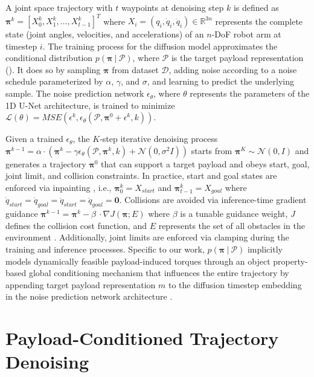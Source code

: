 A joint space trajectory with $t$ waypoints at denoising step $k$ is defined as
$\bm{\pi}^k = [ X_0^k, X_1^k, \dots, X_{t-1}^k ]^T$
where $X_i = (q_i, \dot{q}_i, \ddot{q}_i) \in \mathbb{R}^{3n}$ represents the complete state (joint angles, velocities, and accelerations) of an $n$-DoF robot arm at timestep $i$.
The training process for the diffusion model approximates the conditional distribution $p(\bm{\pi}\ |\ \mathcal{P})$, where $\mathcal{P}$ is the target payload representation ().
It does so by sampling $\bm{\pi}$ from dataset $\mathcal{D}$, adding noise according to a noise schedule parameterized by $\alpha$, $\gamma$, and $\sigma$, and learning to predict the underlying sample. The noise prediction network $\epsilon_\theta$, where $\theta$ represents the parameters of the 1D U-Net architecture, is trained to minimize
    $\mathcal{L}(\theta) = MSE(\epsilon^k, \epsilon_\theta(\mathcal{P}, \bm{\pi}^0 + \epsilon^k, k))$.

Given a trained $\epsilon_\theta$, the $K$-step iterative denoising process
    $\bm{\pi}^{k-1} = \alpha \cdot (\bm{\pi}^k - \gamma\epsilon_\theta(\mathcal{P}, \bm{\pi}^k, k) + \mathcal{N}(0, \sigma^2I))$
starts from $\bm{\pi}^K \sim \mathcal{N}(0, I)$ and generates a trajectory $\bm{\pi}^0$ that can support a target payload and obeys start, goal, joint limit, and collision constraints.
In practice, start and goal states are enforced via inpainting \cite{carvalho2023motion}, i.e., $\bm{\pi}_0^k = X_{start}$ and $\bm{\pi}_{t-1}^k = X_{goal}$ where $\dot{q}_{start} = \dot{q}_{goal} = \ddot{q}_{start} = \ddot{q}_{goal} = \bm{0}$.
Collisions are avoided via inference-time gradient guidance $\bm{\pi}^{k-1} = \bm{\pi}^k - \beta\ \cdot \nabla J(\bm{\pi}; E)$ where $\beta$ is a tunable guidance weight, $J$ defines the collision cost function, and $E$ represents the set of all obstacles in the environment \cite{saha2024edmp}.
Additionally, joint limits are enforced via clamping during the training and inference processes.
Specific to our work, $p(\bm{\pi}\ |\ \mathcal{P})$ implicitly models dynamically feasible payload-induced torques through an object property-based global conditioning mechanism that influences the entire trajectory by appending target payload representation $m$ to the diffusion timestep embedding in the noise prediction network architecture \cite{chi2023diffusionpolicy}.

\section{Payload-Conditioned Trajectory Denoising}
\label{sec:payload:denoising}

